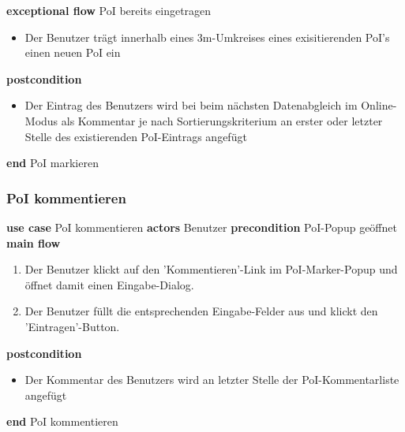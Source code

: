 \indent \indent \textbf{exceptional flow} PoI bereits eingetragen
\begin{itemize}[label={},labelwidth=0pt,leftmargin=24pt,noitemsep,topsep=0pt,parsep=0pt,partopsep=0pt]
\item Der Benutzer trägt innerhalb eines 3m-Umkreises eines exisitierenden PoI's einen neuen PoI ein
\end{itemize}
\indent \indent \textbf{postcondition}
\begin{itemize}[label={},labelwidth=0pt,leftmargin=24pt,noitemsep,topsep=0pt,parsep=0pt,partopsep=0pt]
\item Der Eintrag des Benutzers wird bei beim nächsten Datenabgleich im Online-Modus als Kommentar je nach Sortierungskriterium an erster oder letzter Stelle des  existierenden PoI-Eintrags angefügt
\end{itemize}
\noindent \textbf{end} PoI markieren \newline

\subsubsection{PoI kommentieren}\label{subsubsec:uc_poinote}
\noindent \textbf{use case} PoI kommentieren \newline
\indent \textbf{actors} \newline
\indent \indent Benutzer \newline
\indent \textbf{precondition} \newline
\indent \indent PoI-Popup geöffnet \newline
\indent \textbf{main flow}
\begin{enumerate}[labelwidth=0pt,leftmargin=39pt,noitemsep,topsep=0pt,parsep=0pt,partopsep=0pt]
\item Der Benutzer klickt auf den 'Kommentieren'-Link im PoI-Marker-Popup und öffnet damit einen Eingabe-Dialog.
\item Der Benutzer füllt die entsprechenden Eingabe-Felder aus und klickt den 'Eintragen'-Button.
\end{enumerate}
\indent \indent \textbf{postcondition}
\begin{itemize}[label={},labelwidth=0pt,leftmargin=24pt,noitemsep,topsep=0pt,parsep=0pt,partopsep=0pt]
\item Der Kommentar des Benutzers wird an letzter Stelle der PoI-Kommentarliste angefügt
\end{itemize}
\noindent \textbf{end} PoI kommentieren \newline

